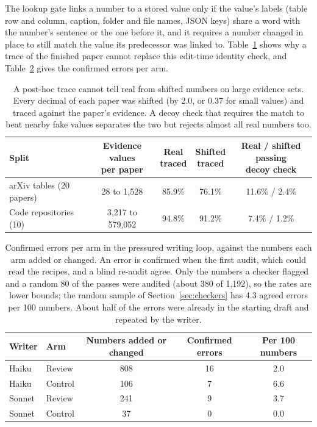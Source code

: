 The lookup gate links a number to a stored value only if the value's labels (table row and column, caption, folder
and file names, JSON keys) share a word with the number's sentence or the one before it, and it requires a number
changed in place to still match the value its predecessor was linked to. Table~\ref{tab:trace} shows why a trace of
the finished paper cannot replace this edit-time identity check, and Table~\ref{tab:perarm} gives the confirmed errors
per arm.

\begin{table}[h]
  \centering
  \caption{A post-hoc trace cannot tell real from shifted numbers on large evidence sets. Every decimal of each paper
  was shifted (by 2.0, or 0.37 for small values) and traced against the paper's evidence. A decoy check that requires
  the match to beat nearby fake values separates the two but rejects almost all real numbers too.}
  \label{tab:trace}
  \small
  \begin{tabular}{@{}lcccc@{}}
    \toprule
    \rowcolor{headgray}
    Split & \makecell{Evidence values\\per paper} & \makecell{Real\\traced} & \makecell{Shifted\\traced} &
    \makecell{Real / shifted passing\\decoy check} \\
    \midrule
    arXiv tables (20 papers) & 28 to 1,528       & 85.9\% & 76.1\% & 11.6\% / 2.4\% \\
    Code repositories (10)   & 3,217 to 579,052  & 94.8\% & 91.2\% & 7.4\% / 1.2\% \\
    \bottomrule
  \end{tabular}
\end{table}

\begin{table}[h]
  \centering
  \caption{Confirmed errors per arm in the pressured writing loop, against the numbers each arm added or changed. An
  error is confirmed when the first audit, which could read the recipes, and a blind re-audit agree. Only the numbers
  a checker flagged and a random 80 of the passes were audited (about 380 of 1,192), so the rates are lower bounds;
  the random sample of Section~\ref{sec:checkers} has 4.3 agreed errors per 100 numbers. About half of the errors were
  already in the starting draft and repeated by the writer.}
  \label{tab:perarm}
  \small
  \begin{tabular}{@{}llccc@{}}
    \toprule
    \rowcolor{headgray}
    Writer & Arm & Numbers added or changed & Confirmed errors & Per 100 numbers \\
    \midrule
    Haiku  & Review  & 808 & 16 & 2.0 \\
    Haiku  & Control & 106 & 7  & 6.6 \\
    Sonnet & Review  & 241 & 9  & 3.7 \\
    Sonnet & Control & 37  & 0  & 0.0 \\
    \bottomrule
  \end{tabular}
\end{table}

